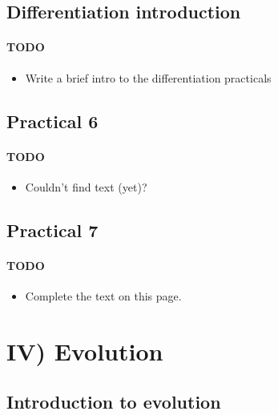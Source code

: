 \documentclass[
  letterpaper,
  DIV=11,
  numbers=noendperiod]{scrreprt}
\providecommand{\tightlist}{%
  \setlength{\itemsep}{0pt}\setlength{\parskip}{0pt}}\usepackage{longtable,booktabs,array}
\theoremstyle{definition}
\theoremstyle{remark}
\begin{document}
\chapter{Differentiation
introduction}\label{differentiation-introduction}

\subsection{TODO}\label{todo-2}

\begin{itemize}
\tightlist
\item
  Write a brief intro to the differentiation practicals
\end{itemize}

\chapter{Practical 6}\label{practical-6}

\subsection{TODO}\label{todo-3}

\begin{itemize}
\tightlist
\item
  Couldn't find text (yet)?
\end{itemize}

\chapter{Practical 7}\label{practical-7}

\subsection{TODO}\label{todo-4}

\begin{itemize}
\tightlist
\item
  Complete the text on this page.
\end{itemize}

\part{IV) Evolution}

\chapter{Introduction to evolution}\label{introduction-to-evolution}
\end{document}
